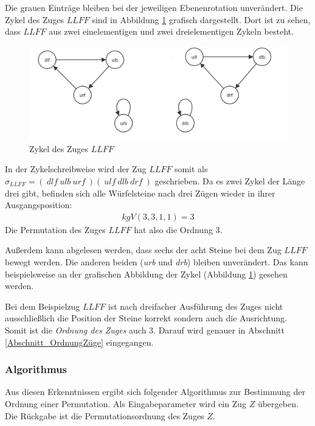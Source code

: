 \documentclass[12pt,a4paper, usenames, dvipsnames]{article}
\theoremstyle{mystyle}
\theoremstyle{definition}
\begin{document}
Die grauen Einträge bleiben bei der jeweiligen Ebenenrotation unverändert. 
Die Zykel des Zuges $LLFF$ sind in Abbildung \ref{Abbildung_ZykelVonLLFF} grafisch dargestellt. Dort ist zu sehen, dass $LLFF$ aus zwei einelementigen und zwei dreielementigen Zykeln besteht.
\begin{figure}[H]
\centering
\includegraphics[scale=0.28]{zykel_LLFF.png}
\caption[Zykel des Zuges $LLFF$]{Zykel des Zuges $LLFF$}
\label{Abbildung_ZykelVonLLFF}
\end{figure}
In der Zykelschreibweise wird der Zug $LLFF$ somit als $\sigma_{LLFF}=( \ \textit{dlf} \ \textit{ulb} \ \textit{urf}\ )(\ \textit{ulf} \ \textit{dlb} \ \textit{drf} \ )$ geschrieben.
Da es zwei Zykel der Länge drei gibt, befinden sich alle Würfelsteine nach drei Zügen wieder in ihrer Ausgangsposition:
\begin{align*}
kgV(3,3,1,1)=3
\end{align*}
Die Permutation des Zuges $LLFF$ hat also die Ordnung $3$.


Außerdem kann abgelesen werden, dass sechs der acht Steine bei dem Zug $LLFF$ bewegt werden. Die anderen beiden (\textit{urb} und \textit{drb}) bleiben unverändert. Das kann beispielsweise an der grafischen Abbildung der Zykel (Abbildung \ref{Abbildung_ZykelVonLLFF}) gesehen werden.


Bei dem Beispielzug $LLFF$ ist nach dreifacher Ausführung des Zuges nicht ausschließlich die Position der Steine korrekt sondern auch die Ausrichtung. Somit ist die \textit{Ordnung des Zuges} auch 3. Darauf wird genauer in Abschnitt \ref{Abschnitt_OrdnungZüge} eingegangen.

\subsubsection*{Algorithmus}

Aus diesen Erkenntnissen ergibt sich folgender Algorithmus zur Bestimmung der Ordnung einer Permutation. Als Eingabeparameter wird ein Zug $Z$ übergeben. Die Rückgabe ist die Permutationsordnung des Zuges $Z$.
\end{document}
